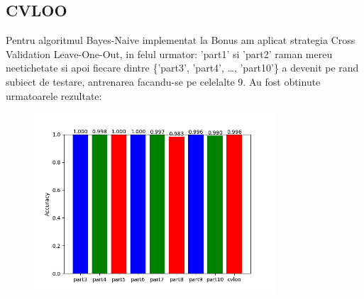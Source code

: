 \documentclass{article}
\begin{document}
\subsection{CVLOO}
    Pentru algoritmul Bayes-Naive implementat la Bonus am aplicat strategia Cross Validation Leave-One-Out, in felul urmator:  'part1' si 'part2' raman mereu neetichetate si apoi fiecare dintre \{'part3', 'part4', \dots , 'part10'\} a devenit pe rand subiect de testare, antrenarea facandu-se pe celelalte 9. Au fost obtinute urmatoarele rezultate:
    \newpage
    \begin{figure}[ht]
    \includegraphics[width=0.8\textwidth]{Bonus_CVLOO.png}
    \label{fig:result_image}
    \end{figure}
\end{document}
